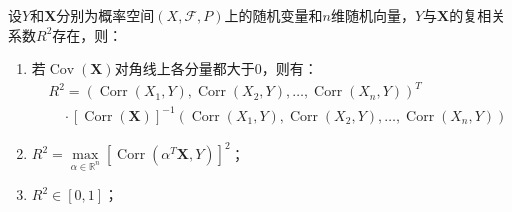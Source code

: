 \begin{property}\label{prop:MultipleCorrelationCoefficient}
	设$Y$和$\mathbf{X}$分别为概率空间$(X,\mathscr{F},P)$上的随机变量和$n$维随机向量，$Y$与$\mathbf{X}$的复相关系数$R^2$存在，则：
	\begin{enumerate}
		\item 若$\operatorname{Cov}(\mathbf{X})$对角线上各分量都大于$0$，则有：
		\begin{align*}
			&R^2=(\operatorname{Corr}(X_1,Y),\operatorname{Corr}(X_2,Y),\dots,\operatorname{Corr}(X_n,Y))^T \\
			&\quad\cdot[\operatorname{Corr}(\mathbf{X})]^{-1}(\operatorname{Corr}(X_1,Y),\operatorname{Corr}(X_2,Y),\dots,\operatorname{Corr}(X_n,Y))
		\end{align*}
		\item $R^2=\max\limits_{\alpha\in\mathbb{R}^{n}}[\operatorname{Corr}(\alpha ^T\mathbf{X},Y)]^2$；
		\item $R^2\in[0,1]$；
	\end{enumerate}
\end{property}
